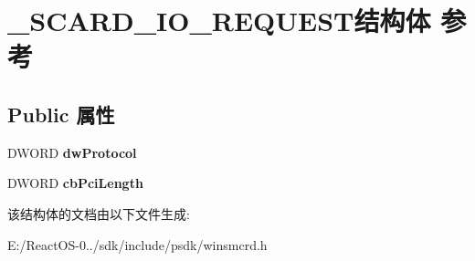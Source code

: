 \hypertarget{struct___s_c_a_r_d___i_o___r_e_q_u_e_s_t}{}\section{\+\_\+\+S\+C\+A\+R\+D\+\_\+\+I\+O\+\_\+\+R\+E\+Q\+U\+E\+S\+T结构体 参考}
\label{struct___s_c_a_r_d___i_o___r_e_q_u_e_s_t}
\subsection*{Public 属性}
\begin{DoxyCompactItemize}
\item 
\mbox{\label{struct___s_c_a_r_d___i_o___r_e_q_u_e_s_t_a1221d341dbc0a60dd08c989666b15042}} 
D\+W\+O\+RD {\bfseries dw\+Protocol}
\item 
\mbox{\label{struct___s_c_a_r_d___i_o___r_e_q_u_e_s_t_ab812245c0feaad115013658ec06aefe1}} 
D\+W\+O\+RD {\bfseries cb\+Pci\+Length}
\end{DoxyCompactItemize}


该结构体的文档由以下文件生成\+:\begin{DoxyCompactItemize}
\item 
E\+:/\+React\+O\+S-\/0../sdk/include/psdk/winsmcrd.\+h\end{DoxyCompactItemize}
